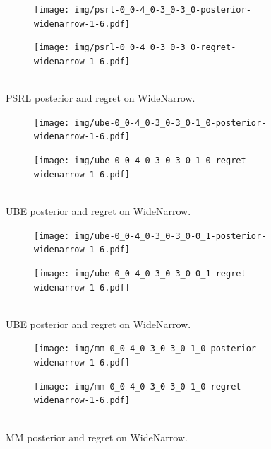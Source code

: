 \documentclass{article}
\begin{document}
\begin{appendices}
\begin{figure}[h!]
\centering
\begin{subfigure}{0.65\textwidth}
\texttt{[image: img/psrl-0\_0-4\_0-3\_0-3\_0-posterior-widenarrow-1-6.pdf]}
\end{subfigure}
\begin{subfigure}{0.34\textwidth}
\texttt{[image: img/psrl-0\_0-4\_0-3\_0-3\_0-regret-widenarrow-1-6.pdf]}~\\~\\
\end{subfigure}
\captionsetup{width=0.9\linewidth}
\caption{PSRL posterior and regret on WideNarrow.}\label{psrl_widenarrow_visual}
\end{figure}

\begin{figure}[h!]
\centering
\begin{subfigure}{0.65\textwidth}
\texttt{[image: img/ube-0\_0-4\_0-3\_0-3\_0-1\_0-posterior-widenarrow-1-6.pdf]}
\end{subfigure}
\begin{subfigure}{0.34\textwidth}
\texttt{[image: img/ube-0\_0-4\_0-3\_0-3\_0-1\_0-regret-widenarrow-1-6.pdf]}~\\~\\
\end{subfigure}
\captionsetup{width=0.9\linewidth}
\caption{UBE posterior and regret on WideNarrow.}\label{ube_widenarrow_visual1}
\end{figure}

\begin{figure}[h!]
\centering
\vspace{-1cm}
\begin{subfigure}{0.65\textwidth}
\texttt{[image: img/ube-0\_0-4\_0-3\_0-3\_0-0\_1-posterior-widenarrow-1-6.pdf]}
\end{subfigure}
\begin{subfigure}{0.34\textwidth}
\texttt{[image: img/ube-0\_0-4\_0-3\_0-3\_0-0\_1-regret-widenarrow-1-6.pdf]}~\\~\\
\end{subfigure}
\captionsetup{width=0.9\linewidth}
\caption{UBE posterior and regret on WideNarrow.}\label{ube_widenarrow_visual01}
\end{figure}

\begin{figure}[h!]
\centering
\begin{subfigure}{0.65\textwidth}
\texttt{[image: img/mm-0\_0-4\_0-3\_0-3\_0-1\_0-posterior-widenarrow-1-6.pdf]}
\end{subfigure}
\begin{subfigure}{0.34\textwidth}
\texttt{[image: img/mm-0\_0-4\_0-3\_0-3\_0-1\_0-regret-widenarrow-1-6.pdf]}~\\~\\
\end{subfigure}
\captionsetup{width=0.9\linewidth}
\caption{MM posterior and regret on WideNarrow.}\label{mm_widenarrow_visual}
\end{figure}


\end{appendices}
\end{document}
